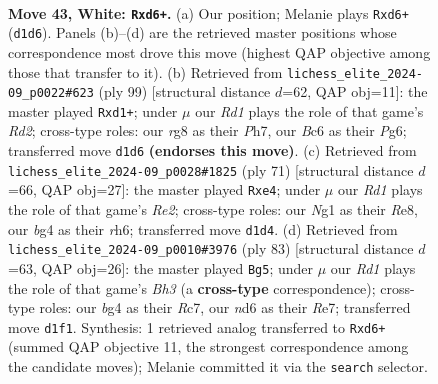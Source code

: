 \documentclass[11pt]{article}
\begin{document}
\clearpage

\begin{figure}[p]\centering
\begin{subfigure}{0.46\textwidth}\centering
\resizebox{\linewidth}{!}{%
\newchessgame
\chessboard[
  setfen={6r1/r7/p1Bn1k2/B5p1/5pb1/PP6/1K5P/R2R2N1 w - - 0 43},
  showmover=false,
  pgfstyle=straightmove, color=movearrow, markmove={d1-d6}
]}
\caption{}
\end{subfigure}\hfill
\begin{subfigure}{0.46\textwidth}\centering
\resizebox{\linewidth}{!}{%
\newchessgame
\chessboard[
  setfen={8/3r1rkp/6p1/2R5/5P2/1P4BP/P5P1/3R2K1 b - - 0 50},
  showmover=false,
  pgfstyle=straightmove, color=movearrow, markmove={d7-d1}
]}
\caption{}
\end{subfigure}
\\[4pt]
\begin{subfigure}{0.46\textwidth}\centering
\resizebox{\linewidth}{!}{%
\newchessgame
\chessboard[
  setfen={4r3/pk2r3/1p5R/7p/1B1RP2P/2P3p1/P1P1b1P1/2K5 b - - 3 36},
  showmover=false,
  pgfstyle=straightmove, color=movearrow, markmove={e7-e4}
]}
\caption{}
\end{subfigure}\hfill
\begin{subfigure}{0.46\textwidth}\centering
\resizebox{\linewidth}{!}{%
\newchessgame
\chessboard[
  setfen={8/2r1r1kp/6pb/2N5/1PBp3R/6PP/5P2/6K1 b - - 0 42},
  showmover=false,
  pgfstyle=straightmove, color=movearrow, markmove={h6-g5}
]}
\caption{}
\end{subfigure}
\caption{\textbf{Move 43, White: \texttt{Rxd6+}.} (a) Our position; Melanie plays \texttt{Rxd6+} (\texttt{d1d6}). Panels (b)--(d) are the retrieved master positions whose correspondence most drove this move (highest QAP objective among those that transfer to it). (b) Retrieved from \texttt{lichess\_elite\_2024-09\_p0022\#623} (ply 99) [structural distance $d$=62, QAP obj=11]: the master played \texttt{Rxd1+}; under $\mu$ our \emph{Rd1} plays the role of that game's \emph{Rd2}; cross-type roles: our \emph{r}g8 as their \emph{P}h7, our \emph{B}c6 as their \emph{P}g6; transferred move \texttt{d1d6} \textbf{(endorses this move)}. (c) Retrieved from \texttt{lichess\_elite\_2024-09\_p0028\#1825} (ply 71) [structural distance $d$=66, QAP obj=27]: the master played \texttt{Rxe4}; under $\mu$ our \emph{Rd1} plays the role of that game's \emph{Re2}; cross-type roles: our \emph{N}g1 as their \emph{R}e8, our \emph{b}g4 as their \emph{r}h6; transferred move \texttt{d1d4}. (d) Retrieved from \texttt{lichess\_elite\_2024-09\_p0010\#3976} (ply 83) [structural distance $d$=63, QAP obj=26]: the master played \texttt{Bg5}; under $\mu$ our \emph{Rd1} plays the role of that game's \emph{Bh3} (a \textbf{cross-type} correspondence); cross-type roles: our \emph{b}g4 as their \emph{R}c7, our \emph{n}d6 as their \emph{R}e7; transferred move \texttt{d1f1}. Synthesis: 1 retrieved analog transferred to \texttt{Rxd6+} (summed QAP objective 11, the strongest correspondence among the candidate moves); Melanie committed it via the \texttt{search} selector.}
\label{fig:thought-m84}
\end{figure}
\end{document}

